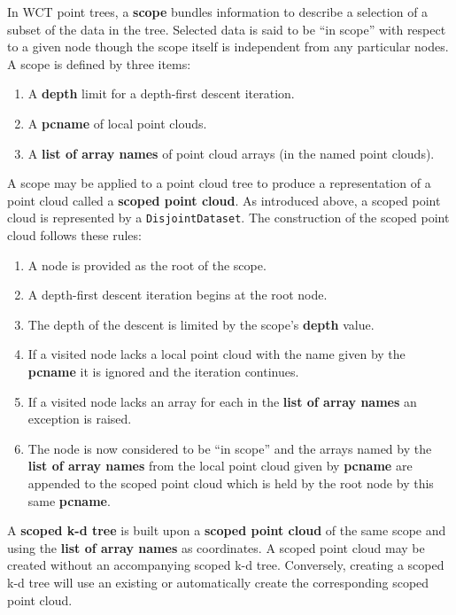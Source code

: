\documentclass{article}
\begin{document}
In WCT point trees, a \textbf{scope} bundles information to describe a selection of a subset of the data in the tree.  Selected data is said to be ``in scope'' with respect to a given node though the scope itself is independent from any particular nodes.  A scope is defined by three items:

\begin{enumerate}
\item A \textbf{depth} limit for a depth-first descent iteration.
\item A \textbf{pcname} of local point clouds.
\item A \textbf{list of array names} of point cloud arrays (in the named point clouds).
\end{enumerate}

A scope may be applied to a point cloud tree to produce a representation of a point cloud called a 
\textbf{scoped point cloud}.  As introduced above, a scoped point cloud is represented by a \texttt{DisjointDataset}.
The construction of the scoped point cloud follows these rules:

\begin{enumerate}
\item A node is provided as the root of the scope.
\item A depth-first descent iteration begins at the root node.
\item The depth of the descent is limited by the scope's \textbf{depth} value.
\item If a visited node lacks a local point cloud with the name given by the \textbf{pcname} it is ignored and the iteration continues.
\item If a visited node lacks an array for each in the \textbf{list of array names} an exception is raised.
\item The node is now considered to be ``in scope'' and the arrays named by the \textbf{list of array names} from the local point cloud given by \textbf{pcname} are appended to the scoped point cloud which is held by the root node by this same \textbf{pcname}.
\end{enumerate}

A \textbf{scoped k-d tree} is built upon a \textbf{scoped point cloud} of the same scope and using the \textbf{list of array names} as coordinates.  A scoped point cloud may be created without an accompanying scoped k-d tree.  Conversely, creating a scoped k-d tree will use an existing or automatically create the corresponding scoped point cloud.
\end{document}
